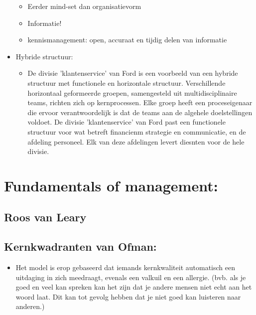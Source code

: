 \documentclass[12pt]{article}
\begin{document}
\begin{itemize}
\begin{itemize}
        \item Eerder mind-set dan organisatievorm
        \item[] Informatie!
        \item kennismanagement: open, accuraat en tijdig delen van informatie
    \end{itemize}
    \item  Hybride structuur:\begin{itemize}
        \item De divisie 'klantenservice' van Ford is een voorbeeld van een hybride structuur met functionele en horizontale structuur. Verschillende horizontaal geformeerde groepen, samengesteld uit multidisciplinaire teams, richten zich op kernprocessen. Elke groep heeft een proceseigenaar die ervoor verantwoordelijk is dat de teams aan de algehele doelstellingen voldoet. De divisie 'klantenservice' van Ford past een functionele structuur voor wat betreft financienm strategie en communicatie, en de afdeling personeel. Elk van deze afdelingen levert diesnten voor de hele divisie. 
    \end{itemize}
\end{itemize}
\section{Fundamentals of management:}
\subsection{Roos van Leary}
\subsection{Kernkwadranten van Ofman:}
\begin{itemize}
    \item Het model is erop gebaseerd dat iemands kernkwaliteit automatisch een uitdaging in zich meedraagt, evenals een valkuil en een allergie. (bvb. als je goed en veel kan spreken kan het zijn dat je andere mensen niet echt aan het woord laat. Dit kan tot gevolg hebben dat je niet goed kan luisteren naar anderen.)
\end{itemize}
\end{document}

